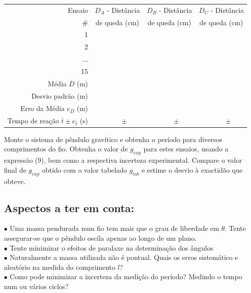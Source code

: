 \documentclass[a4paper,twoside,12pt]{article}      %
\begin{document}
\begin{center}
\begin{tabular}{|r|c|c|c|}
\hline
Ensaio  & $D_A$ - Distância & $D_B$ - Distância & $D_C$ - Distância  \\
\# & de queda (cm) & de queda (cm) & de queda (cm)\\
\hline \hline
1 & & & \\
\hline
2 & &  &\\
\hline ... & & & \\
\hline 15 & & & \\
\hline \hline
Média $\overline{D}$ (m) & &  & \\
Desvio padrão (m) & & & \\
Erro da Média  $e_{\overline{D}}$ (m) & & & \\ 
Tempo de reação $\overline{t} \pm e_{\overline{t}}$ (s) & $\qquad \pm$  & $\qquad \pm$  & $\qquad \pm$  \\
\hline
\end{tabular}
\end{center}

Monte o sistema de pêndulo gravítico e obtenha o período para diversos comprimentos do fio. 
Obtenha o valor de $g_{exp}$ para estes ensaios, usando a expressão (9), bem como a respectiva incerteza experimental. 
Compare o valor final de $g_{exp}$ obtido com o valor tabelado $g_{tab}$ e estime o desvio à exactidão que obteve. 

\smallskip

\subsection{\sf Aspectos a ter em conta:}

 \begin{flushleft}
	 $\bullet$ Uma massa pendurada num fio tem mais que o grau de liberdade em $\theta$. Tente assegurar-se que o pêndulo oscila apenas ao longo de um plano. \\
	 $\bullet$ Tente minimizar o efeitos de paralaxe na determinação dos ângulos\\
	 $\bullet$ Naturalmente a massa utilizada não é pontual. Quais os erros sistemático e aleatório na medida do comprimento $l$? \\	
	 $\bullet$ Como pode minimizar a incerteza da medição do período? Medindo o tempo num ou vários ciclos? \\
\end{flushleft} 
\end{document}
